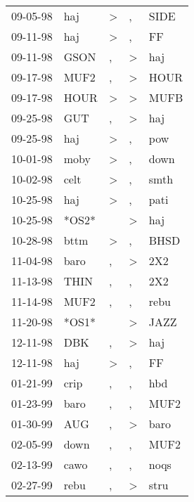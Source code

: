\begin{supertabular}{lllll}
 09-05-98 &    haj &     \textgreater &                , &   SIDE \\
 09-11-98 &    haj &     \textgreater &                , &     FF \\
 09-11-98 &   GSON &                , &     \textgreater &    haj \\
 09-17-98 &   MUF2 &                , &     \textgreater &   HOUR \\
 09-17-98 &   HOUR &     \textgreater &     \textgreater &   MUFB \\
 09-25-98 &    GUT &                , &     \textgreater &    haj \\
 09-25-98 &    haj &     \textgreater &                , &    pow \\
 10-01-98 &   moby &     \textgreater &                , &   down \\
 10-02-98 &   celt &     \textgreater &                , &   smth \\
 10-25-98 &    haj &     \textgreater &                , &   pati \\
 10-25-98 &  *OS2* &                  &     \textgreater &    haj \\
 10-28-98 &   bttm &     \textgreater &                , &   BHSD \\
 11-04-98 &   baro &                , &     \textgreater &    2X2 \\
 11-13-98 &   THIN &                , &                , &    2X2 \\
 11-14-98 &   MUF2 &                , &                , &   rebu \\
 11-20-98 &  *OS1* &                  &     \textgreater &   JAZZ \\
 12-11-98 &    DBK &                , &     \textgreater &    haj \\
 12-11-98 &    haj &     \textgreater &                , &     FF \\
 01-21-99 &   crip &                , &                , &    hbd \\
 01-23-99 &   baro &                , &                , &   MUF2 \\
 01-30-99 &    AUG &                , &     \textgreater &   baro \\
 02-05-99 &   down &                , &                , &   MUF2 \\
 02-13-99 &   cawo &                , &                , &   noqs \\
 02-27-99 &   rebu &                , &     \textgreater &   stru \\

\end{supertabular}
